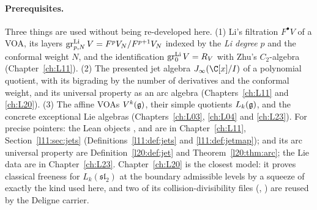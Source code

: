 \paragraph{Prerequisites.} Three things are used without being re-developed here.
(1) Li's filtration $F^\bullet V$ of a VOA, its layers $\operatorname{gr}^{\mathrm{Li}}_{p,N}V=F^pV_N/F^{p+1}V_N$ indexed by
the \emph{Li degree} $p$ and the conformal weight $N$, and the identification $\operatorname{gr}^{\mathrm{Li}}_0V=R_V$ with
Zhu's $C_2$-algebra (Chapter~\ref{ch:L11}). (2) The presented jet algebra $\ltwentyfourJ(\C[x]/I)$ of a
polynomial quotient, with its bigrading by the number of derivatives and the conformal weight, and its universal
property as an arc algebra (Chapters~\ref{ch:L11} and \ref{ch:L20}). (3) The affine VOAs $V^k(\mathfrak g)$,
their simple quotients $L_k(\mathfrak g)$, and the concrete exceptional Lie algebras (Chapters~\ref{ch:L03},
\ref{ch:L04} and \ref{ch:L23}). For precise pointers: the Lean objects ,
 and  are in Chapter~\ref{ch:L11},
Section~\ref{l11:sec:jets} (Definitions~\ref{l11:def:jets} and \ref{l11:def:jetmap});
 and its arc universal property are Definition~\ref{l20:def:jet} and
Theorem~\ref{l20:thm:arc}; the Lie data  are in Chapter~\ref{ch:L23}. Chapter~\ref{ch:L20} is the
closest model: it proves classical freeness for $L_k(\mathfrak{sl}_2)$ at the boundary admissible levels by a
squeeze of exactly the kind used here, and two of its collision-divisibility files
(,
) are reused by the Deligne carrier.

